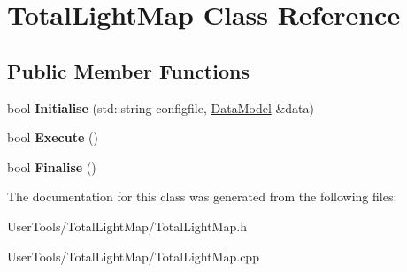 \hypertarget{classTotalLightMap}{
\section{TotalLightMap Class Reference}
\label{classTotalLightMap}
}
\subsection*{Public Member Functions}
\begin{DoxyCompactItemize}
\item 
\hypertarget{classTotalLightMap_ac687c503a670297e4a07b2dee19c5fb5}{
bool {\bfseries Initialise} (std::string configfile, \hyperlink{classDataModel}{DataModel} \&data)}
\label{classTotalLightMap_ac687c503a670297e4a07b2dee19c5fb5}

\item 
\hypertarget{classTotalLightMap_a8c2a005f4cdbbeb491a18cb99c4d2fc8}{
bool {\bfseries Execute} ()}
\label{classTotalLightMap_a8c2a005f4cdbbeb491a18cb99c4d2fc8}

\item 
\hypertarget{classTotalLightMap_afeb9bd48e4fea881d42033ec63122ff9}{
bool {\bfseries Finalise} ()}
\label{classTotalLightMap_afeb9bd48e4fea881d42033ec63122ff9}

\end{DoxyCompactItemize}


The documentation for this class was generated from the following files:\begin{DoxyCompactItemize}
\item 
UserTools/TotalLightMap/TotalLightMap.h\item 
UserTools/TotalLightMap/TotalLightMap.cpp\end{DoxyCompactItemize}

